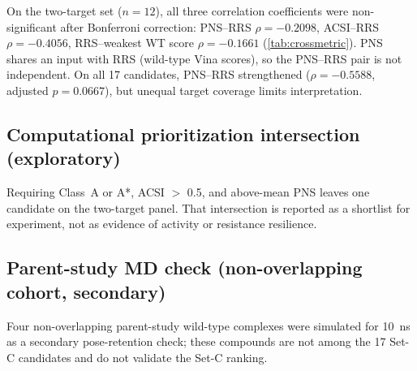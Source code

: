 \documentclass[journal=jcisd8,manuscript=article,layout=traditional]{achemso}
\begin{document}
On the two-target set ($n=\num{12}$), all three correlation coefficients were non-significant after Bonferroni correction: PNS--RRS $\rho=\num{-0.2098}$, ACSI--RRS $\rho=\num{-0.4056}$, RRS--weakest WT score $\rho=\num{-0.1661}$ (\cref{tab:crossmetric}). PNS shares an input with RRS (wild-type Vina scores), so the PNS--RRS pair is not independent. On all 17 candidates, PNS--RRS strengthened ($\rho=-0.5588$, adjusted $p=0.0667$), but unequal target coverage limits interpretation.

\subsection{Computational prioritization intersection (exploratory)}

Requiring Class~A or A*, ACSI $>$ \num{0.5}, and above-mean PNS leaves one candidate on the two-target panel. That intersection is reported as a shortlist for experiment, not as evidence of activity or resistance resilience.

\subsection{Parent-study MD check (non-overlapping cohort, secondary)}

Four non-overlapping parent-study wild-type complexes were simulated for \qty{10}{\ns} as a secondary pose-retention check; these compounds are not among the 17 Set-C candidates and do not validate the Set-C ranking.

\begin{table}[htbp]
\centering
\caption[MD stability metrics]{Production MD stability metrics for parent-study wild-type complexes (\qty{10}{\ns}). BB RMSD, ligand RMSD, minimum distance, contacts, and H-bonds are computed from PBC-unwrapped trajectories.}
\label{tab:md_stability}
\end{table}
\end{document}
